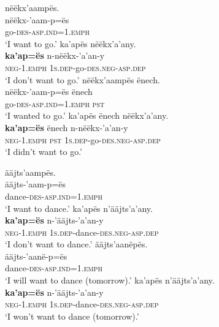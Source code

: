 \documentclass[output=paper,colorlinks,citecolor=brown,draft]{langscibook}
\begin{document}
\ea\label{ex:mix:93}
    \ea\label{ex:mix:93a}
        \glll nëëkx’aampës.\\
             nëëkx-’aam-p=ës\\
             go-\textsc{des-asp.ind=1.emph}\\
        \glt ‘I want to go.’
    \ex\label{ex:mix:93b}
        \glll ka’apës nëëkx’a’any.\\ 
              \textbf{ka’ap=ës} n-nëëkx-’a’an-y\\
              \textsc{neg-1.emph} \textsc{1s.dep}{}-go-\textsc{des.neg-asp.dep}\\
        \glt ‘I don’t want to go.’
    \ex\label{ex:mix:93c}
        \glll nëëkx’aampës ënech.\\
             nëëkx-’aam-p=ës ënech\\
             go-\textsc{des-asp.ind=1.emph} \textsc{pst}\\
        \glt ‘I wanted to go.’
    \ex\label{ex:mix:93d}
        \glll ka’apës ënech nëëkx’a’any.\\ 
              \textbf{ka’ap=ës} ënech n-nëëkx-’a’an-y\\
              \textsc{neg-1.emph} \textsc{pst} \textsc{1s.dep}{}-go-\textsc{des.neg-asp.dep}\\
        \glt ‘I didn’t want to go.’
    \z
\z 

\ea\label{ex:mix:94}
    \ea\label{ex:mix:94a}
        \glll  ääjts’aampës. \\
             ääjts-’aam-p=ës \\
             dance-\textsc{des-asp.ind=1.emph}\\
        \glt ‘I want to dance.’
    \ex\label{ex:mix:94b}
        \glll ka’apës n’ääjts’a’any.\\ 
              \textbf{ka’ap=ës} n-’ääjts-’a’an-y\\
              \textsc{neg-1.emph} \textsc{1s.dep-}dance-\textsc{des.neg-asp.dep}\\
        \glt ‘I don’t want to dance.’
    \ex\label{ex:mix:94c}
        \glll ääjts’aanëpës. \\
             ääjts-’aanë-p=ës \\
             dance-\textsc{des-asp.ind=1.emph}\\
        \glt ‘I will want to dance (tomorrow).’
    \ex\label{ex:mix:94d}
        \glll ka’apës n’ääjts’a’any. \\ 
              \textbf{ka’ap=ës} n-’ääjts-’a’an-y \\
              \textsc{neg-1.emph} \textsc{1s.dep}{}-dance-\textsc{des.neg-asp.dep}\\
        \glt ‘I won’t want to dance (tomorrow).’
    \z
\z 
 
\end{document}
